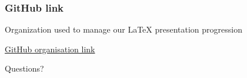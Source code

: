 \documentclass{beamer}
\begin{document}

\begin{frame}
\frametitle{GitHub link}

Organization used to manage our LaTeX presentation progression

\vspace{5mm}


\href{https://github.com/Research-Methods-Presentation}{GitHub organisation link} 

\end{frame}


\begin{frame}
\Huge{\centerline{Questions?}}
\end{frame}

\end{document}
